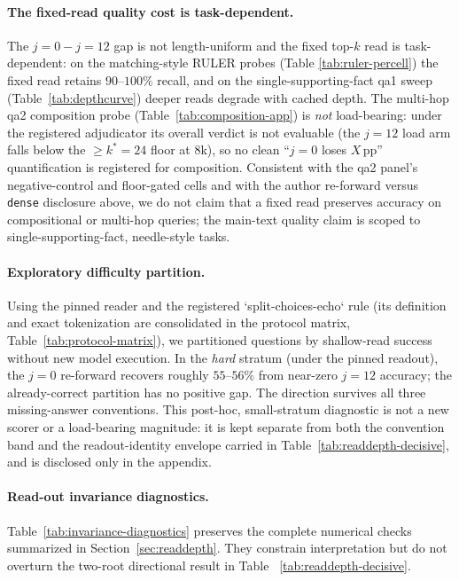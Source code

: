 \FloatBarrier

\paragraph{The fixed-read quality cost is task-dependent.}
The $j{=}0{-}j{=}12$ gap is not length-uniform and the fixed top-$k$ read is
task-dependent: on the matching-style RULER probes (Table
\ref{tab:ruler-percell}) the fixed read retains $90$--$100\%$ recall, and on
the single-supporting-fact qa1 sweep (Table~\ref{tab:depthcurve}) deeper reads
degrade with cached depth.  The multi-hop qa2 composition probe
(Table~\ref{tab:composition-app}) is \emph{not} load-bearing: under the
registered adjudicator its overall verdict is not evaluable (the
$j{=}12$ load arm falls below the $\geq k^*{=}24$ floor at 8k), so no clean
``$j{=}0$ loses $X$\,pp'' quantification is registered for composition.
Consistent with the qa2 panel's negative-control and floor-gated cells and with
the author re-forward versus \texttt{dense} disclosure above, we do not claim that
a fixed read preserves accuracy on compositional or multi-hop queries; the
main-text quality claim is scoped to single-supporting-fact, needle-style
tasks.

\FloatBarrier

\paragraph{Exploratory difficulty partition.}
Using the pinned reader and the registered `split-choices-echo` rule (its
definition and exact tokenization are consolidated in the protocol matrix,
Table~\ref{tab:protocol-matrix}), we partitioned questions by shallow-read
success without new model execution.  In the \emph{hard} stratum (under the
pinned readout), the
$j=0$ re-forward recovers roughly $55$--$56\%$ from near-zero $j=12$ accuracy;
the already-correct partition has no positive gap.  The direction survives all
three missing-answer conventions.  This post-hoc, small-stratum diagnostic is
not a new scorer or a load-bearing magnitude: it is kept separate from both the
convention band and the readout-identity envelope carried in
Table~\ref{tab:readdepth-decisive}, and is disclosed only in the appendix.

\FloatBarrier

\paragraph{Read-out invariance diagnostics.}
Table~\ref{tab:invariance-diagnostics} preserves the complete numerical checks
summarized in Section~\ref{sec:readdepth}.  They constrain interpretation but do
not overturn the two-root directional result in Table~
\ref{tab:readdepth-decisive}.

